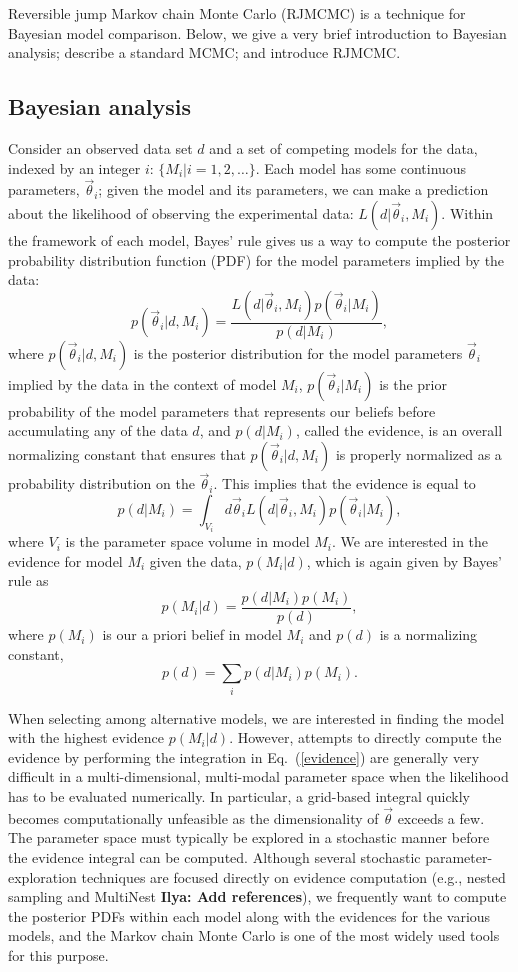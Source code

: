 \documentclass[prd,preprint]{revtex4}
\newcommand{\vtheta}{\vec{\theta}}
\newcommand{\be}{\begin{equation}}
\newcommand{\ee}{\end{equation}}
\newcommand{\bel}[1]{\begin{equation}\label{#1}}
\newcommand{\ilya}[1]{{\color{red} \bf Ilya: #1}}
\begin{document}
Reversible jump Markov chain Monte Carlo (RJMCMC) \cite{Green1995} is a technique for Bayesian model comparison.  Below, we give a very brief introduction to Bayesian analysis; describe a standard MCMC; and introduce RJMCMC.

\subsection{Bayesian analysis}

Consider an observed data set $d$ and a set of competing models for the data, indexed by an integer $i$: $\{M_i | i = 1, 2, \ldots \}$.  Each model has some continuous parameters, $\vtheta_i$; given the model and its parameters, we can make a prediction about the likelihood of observing
the experimental data: $L(d|\vtheta_i, M_i)$.  Within the framework of each model, Bayes' rule gives us a way to compute the posterior probability distribution function (PDF) for the model
parameters implied by the data:
\begin{equation}
  p(\vtheta_i | d, M_i) = \frac{L(d|\vtheta_i, M_i) p(\vtheta_i|M_i)}{p(d|M_i)},
\end{equation}
where $p(\vtheta_i |d, M_i)$ is the posterior distribution for the
model parameters $\vtheta_i$ implied by the data in the context of
model $M_i$, $p(\vtheta_i|M_i)$ is the prior
probability of the model parameters that 
represents our beliefs before accumulating any of the data $d$, and
$p(d|M_i)$, called the evidence, is an overall normalizing constant that ensures that $p(\vtheta_i|d,M_i)$ is properly normalized as a probability distribution on
the $\vtheta_i$.  This implies that the evidence is equal to
\bel{evidence}
  p(d|M_i) = \int_{V_i} d\vtheta_i L(d|\vtheta_i, M_i) p(\vtheta_i|M_i),
\end{equation}
where $V_i$ is the parameter space volume in model $M_i$.  We are interested in the evidence for model $M_i$ given the data, $p(M_i|d)$, which is again given by Bayes' rule as
\begin{equation}
p(M_i|d) = \frac{p(d|M_i) p(M_i)}{p(d)},
\end{equation}
where $p(M_i)$ is our a priori belief in model $M_i$ and $p(d)$ is a normalizing constant, 
\be
p(d)=\sum_i p(d|M_i) p(M_i).
\ee

When selecting among alternative models, we are interested in finding the model with the highest evidence $p(M_i|d)$.  However, attempts to directly compute the evidence by performing the integration in Eq.~(\ref{evidence}) are generally very difficult in a multi-dimensional, multi-modal parameter space when the likelihood has to be evaluated numerically.  In particular, a grid-based integral quickly becomes computationally unfeasible as the dimensionality of $\vtheta$ exceeds a few.  The parameter space must typically be explored in a stochastic manner before the evidence integral can be computed.  Although several stochastic parameter-exploration techniques are focused directly on evidence computation (e.g., nested sampling and MultiNest \ilya {Add references}), we frequently want to compute the posterior PDFs within each model along with the evidences for the various models, and the Markov chain Monte Carlo is one of the most widely used tools for this purpose. 
\end{document}
